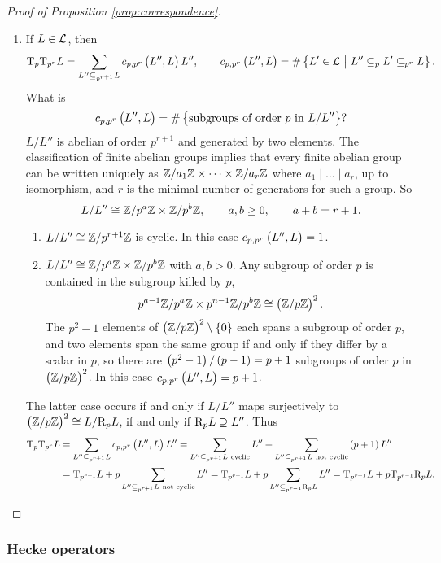 \begin{proof}[Proof of Proposition \ref{prop:correspondence}]
\begin{enumerate}
\item If $ L \in \mathcal{L} $, then
$$ \T_p\T_{p^r}L = \sum_{L'' \subseteq_{p^{r + 1}} L} c_{p, p^r}\br{L'', L}L'', \qquad c_{p, p^r}\br{L'', L} = \#\cbr{L' \in \LLL \st L'' \subseteq_p L' \subseteq_{p^r} L}. $$
What is
$$ c_{p, p^r}\br{L'', L} = \#\cbr{\text{subgroups of order} \ p \ \text{in} \ L / L''}? $$
$ L / L'' $ is abelian of order $ p^{r + 1} $ and generated by two elements. The classification of finite abelian groups implies that every finite abelian group can be written uniquely as $ \mathbb{Z} / a_1\mathbb{Z} \times \dots \times \mathbb{Z} / a_r\mathbb{Z} $ where $ a_1 \mid \dots \mid a_r $, up to isomorphism, and $ r $ is the minimal number of generators for such a group. So
$$ L / L'' \cong \mathbb{Z} / p^a\mathbb{Z} \times \mathbb{Z} / p^b\mathbb{Z}, \qquad a, b \ge 0, \qquad a + b = r + 1. $$
\begin{enumerate}[label=Case \arabic*., leftmargin=0.5in]
\item $ L / L'' \cong \mathbb{Z} / p^{r + 1}\mathbb{Z} $ is cyclic. In this case $ c_{p, p^r}\br{L'', L} = 1 $.
\item $ L / L'' \cong \mathbb{Z} / p^a\mathbb{Z} \times \mathbb{Z} / p^b\mathbb{Z} $ with $ a, b > 0 $. Any subgroup of order $ p $ is contained in the subgroup killed by $ p $,
$$ p^{a - 1}\ZZ / p^a\ZZ \times p^{n - 1}\ZZ / p^b\ZZ \cong \br{\ZZ / p\ZZ}^2. $$
The $ p^2 - 1 $ elements of $ \br{\ZZ / p\ZZ}^2 \setminus \cbr{0} $ each spans a subgroup of order $ p $, and two elements span the same group if and only if they differ by a scalar in $ \unit{p} $, so there are $ \br{p^2 - 1} / \br{p - 1} = p + 1 $ subgroups of order $ p $ in $ \br{\ZZ / p\ZZ}^2 $. In this case $ c_{p, p^r}\br{L'', L} = p + 1 $.
\end{enumerate}
The latter case occurs if and only if $ L / L'' $ maps surjectively to $ \br{\ZZ / p\ZZ}^2 \cong L / \R_pL $, if and only if $ \mathrm{R}_pL \supseteq L'' $. Thus
\begin{align*}
\T_p\T_{p^r}L
& = \sum_{L'' \subseteq_{p^{r + 1}} L} c_{p, p^r}\br{L'', L}L''
= \sum_{L'' \subseteq_{p^{r + 1}} L \ \text{cyclic}} L'' + \sum_{L'' \subseteq_{p^{r + 1}} L \ \text{not cyclic}} \br{p + 1}L'' \\
& = \T_{p^{r + 1}}L + p\sum_{L'' \subseteq_{p^{r + 1}} L \ \text{not cyclic}} L''
= \T_{p^{r + 1}}L + p\sum_{L'' \subseteq_{p^{r - 1}} \R_pL} L''
= \T_{p^{r + 1}}L + p\T_{p^{r - 1}}\R_pL.
\end{align*}
\end{enumerate}
\end{proof}

\subsubsection{Hecke operators}

